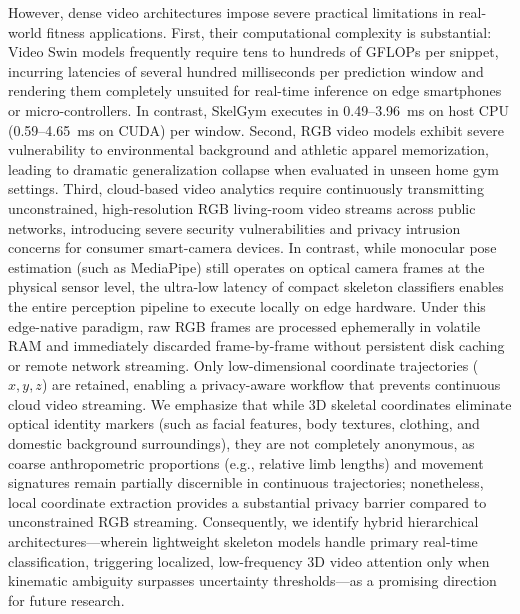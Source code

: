 \documentclass[preprint,12pt]{elsarticle}
\begin{document}
However, dense video architectures impose severe practical limitations in real-world fitness applications. First, their computational complexity is substantial: Video Swin models frequently require tens to hundreds of GFLOPs per snippet, incurring latencies of several hundred milliseconds per prediction window and rendering them completely unsuited for real-time inference on edge smartphones or micro-controllers. In contrast, SkelGym executes in 0.49--3.96~ms on host CPU (0.59--4.65~ms on CUDA) per window. Second, RGB video models exhibit severe vulnerability to environmental background and athletic apparel memorization, leading to dramatic generalization collapse when evaluated in unseen home gym settings. Third, cloud-based video analytics require continuously transmitting unconstrained, high-resolution RGB living-room video streams across public networks, introducing severe security vulnerabilities and privacy intrusion concerns for consumer smart-camera devices. In contrast, while monocular pose estimation (such as MediaPipe) still operates on optical camera frames at the physical sensor level, the ultra-low latency of compact skeleton classifiers enables the entire perception pipeline to execute locally on edge hardware. Under this edge-native paradigm, raw RGB frames are processed ephemerally in volatile RAM and immediately discarded frame-by-frame without persistent disk caching or remote network streaming. Only low-dimensional coordinate trajectories ($x, y, z$) are retained, enabling a privacy-aware workflow that prevents continuous cloud video streaming. We emphasize that while 3D skeletal coordinates eliminate optical identity markers (such as facial features, body textures, clothing, and domestic background surroundings), they are not completely anonymous, as coarse anthropometric proportions (e.g., relative limb lengths) and movement signatures remain partially discernible in continuous trajectories; nonetheless, local coordinate extraction provides a substantial privacy barrier compared to unconstrained RGB streaming. Consequently, we identify hybrid hierarchical architectures---wherein lightweight skeleton models handle primary real-time classification, triggering localized, low-frequency 3D video attention only when kinematic ambiguity surpasses uncertainty thresholds---as a promising direction for future research.
\end{document}
